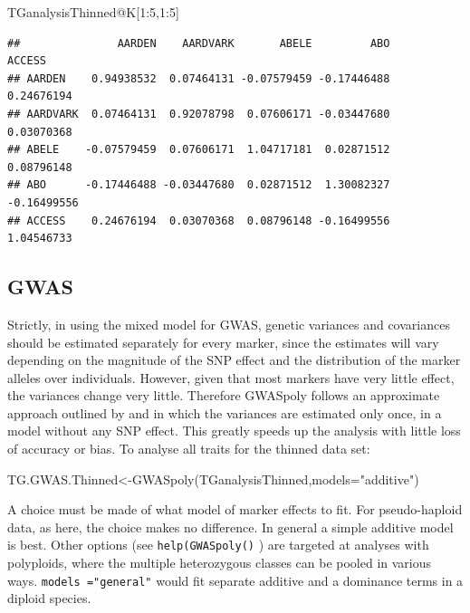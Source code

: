 \documentclass[
]{book}
\newenvironment{Shaded}{\begin{snugshade}}{\end{snugshade}}
\newcommand{\AttributeTok}[1]{\textcolor[rgb]{0.77,0.63,0.00}{#1}}
\newcommand{\DecValTok}[1]{\textcolor[rgb]{0.00,0.00,0.81}{#1}}
\newcommand{\FunctionTok}[1]{\textcolor[rgb]{0.00,0.00,0.00}{#1}}
\newcommand{\NormalTok}[1]{#1}
\newcommand{\OtherTok}[1]{\textcolor[rgb]{0.56,0.35,0.01}{#1}}
\newcommand{\SpecialCharTok}[1]{\textcolor[rgb]{0.00,0.00,0.00}{#1}}
\newcommand{\StringTok}[1]{\textcolor[rgb]{0.31,0.60,0.02}{#1}}
\begin{document}
\begin{Shaded}
\begin{Highlighting}[]
\NormalTok{TGanalysisThinned}\SpecialCharTok{@}\NormalTok{K[}\DecValTok{1}\SpecialCharTok{:}\DecValTok{5}\NormalTok{,}\DecValTok{1}\SpecialCharTok{:}\DecValTok{5}\NormalTok{] }
\end{Highlighting}
\end{Shaded}

\begin{verbatim}
##               AARDEN    AARDVARK       ABELE         ABO      ACCESS
## AARDEN    0.94938532  0.07464131 -0.07579459 -0.17446488  0.24676194
## AARDVARK  0.07464131  0.92078798  0.07606171 -0.03447680  0.03070368
## ABELE    -0.07579459  0.07606171  1.04717181  0.02871512  0.08796148
## ABO      -0.17446488 -0.03447680  0.02871512  1.30082327 -0.16499556
## ACCESS    0.24676194  0.03070368  0.08796148 -0.16499556  1.04546733
\end{verbatim}

\hypertarget{gwas}{%
\subsection{GWAS}\label{gwas}}

Strictly, in using the mixed model for GWAS, genetic variances and covariances should be estimated separately for every marker, since the estimates will vary depending on the magnitude of the SNP effect and the distribution of the marker alleles over individuals. However, given that most markers have very little effect, the variances change very little.
Therefore GWASpoly follows an approximate approach outlined by \citet{kang_variance_2010} and \citet{zhang_mixed_2010} in which the variances are estimated only once, in a model without any SNP effect. This greatly speeds up the analysis with little loss of accuracy or bias. To analyse all traits for the thinned data set:

\begin{Shaded}
\begin{Highlighting}[]
\NormalTok{TG.GWAS.Thinned}\OtherTok{\textless{}{-}}\FunctionTok{GWASpoly}\NormalTok{(TGanalysisThinned,}\AttributeTok{models=}\StringTok{"additive"}\NormalTok{) }
\end{Highlighting}
\end{Shaded}

A choice must be made of what model of marker effects to fit. For pseudo-haploid data, as here, the choice makes no difference. In general a simple additive model is best. Other options (see \texttt{help(GWASpoly()} ) are targeted at analyses with polyploids, where the multiple heterozygous classes can be pooled in various ways. \texttt{models\ ="general"} would fit separate additive and a dominance terms in a diploid species.
\end{document}
